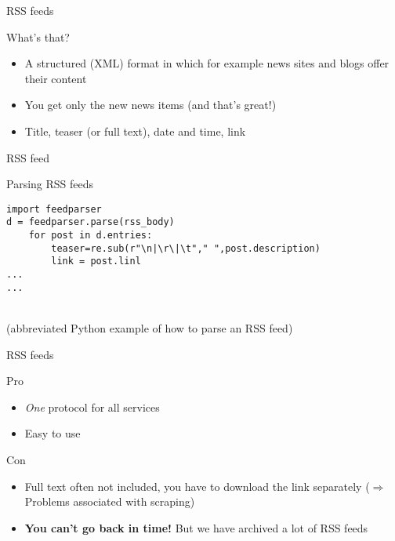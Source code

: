 \documentclass{beamer}
\begin{document}
\begin{frame}{RSS feeds}
	\begin{block}{What's that?}
		\begin{itemize}
			\item<1-> A structured (XML) format in which for example news sites and blogs offer their content
			\item<2-> You get only the new news items (and that's great!)
			\item<3-> Title, teaser (or full text), date and time, link
		\end{itemize}
	\end{block}
\end{frame}

\begin{frame}{RSS feed}
\end{frame}


\begin{frame}[fragile]{Parsing RSS feeds}
\begin{lstlisting}
import feedparser
d = feedparser.parse(rss_body)
    for post in d.entries:
        teaser=re.sub(r"\n|\r\|\t"," ",post.description)
        link = post.linl
...
...
\end{lstlisting}
~\\ \tiny{(abbreviated Python example of how to parse an RSS feed)}
\end{frame}


\begin{frame}{RSS feeds}
\begin{block}{Pro}
\begin{itemize}
\item \emph{One} protocol for all services
\item Easy to use
\end{itemize}
\end{block}

\begin{block}{Con}
\begin{itemize}
\item Full text often not included, you have to download the link separately ($\Rightarrow$ Problems associated with scraping) 
\item {\textbf{You can't go back in time!}} \footnotesize{But we have archived a lot of RSS feeds}
\end{itemize}
\end{block}

\end{frame}
\end{document}
